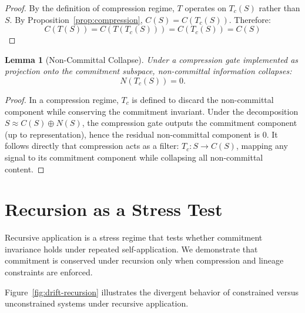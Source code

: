 \documentclass[11pt,a4paper]{article}
\newtheorem{lemma}[theorem]{Lemma}
\begin{document}
\begin{proof}
By the definition of compression regime, $T$ operates on $T_c(S)$ rather than $S$. By Proposition~\ref{prop:compression}, $C(S) = C(T_c(S))$. Therefore:
\begin{equation}
C(T(S)) = C(T(T_c(S))) = C(T_c(S)) = C(S)
\end{equation}
\end{proof}

\begin{lemma}[Non-Committal Collapse]
\label{lem:collapse}
Under a compression gate implemented as projection onto the commitment subspace, non-committal information collapses:
\begin{equation}
N(T_c(S)) = 0.
\end{equation}
\end{lemma}

\begin{proof}
In a compression regime, $T_c$ is defined to discard the non-committal component while conserving the commitment invariant. Under the decomposition $S \approx C(S) \oplus N(S)$, the compression gate outputs the commitment component (up to representation), hence the residual non-committal component is $0$. It follows directly that compression acts as a filter: $T_c: S \rightarrow C(S)$, mapping any signal to its commitment component while collapsing all non-committal content.
\end{proof}

\section{Recursion as a Stress Test}
\label{sec:recursion}

Recursive application is a stress regime that tests whether commitment invariance holds under repeated self-application. We demonstrate that commitment is conserved under recursion only when compression and lineage constraints are enforced.

Figure~\ref{fig:drift-recursion} illustrates the divergent behavior of constrained versus unconstrained systems under recursive application.


\end{document}
